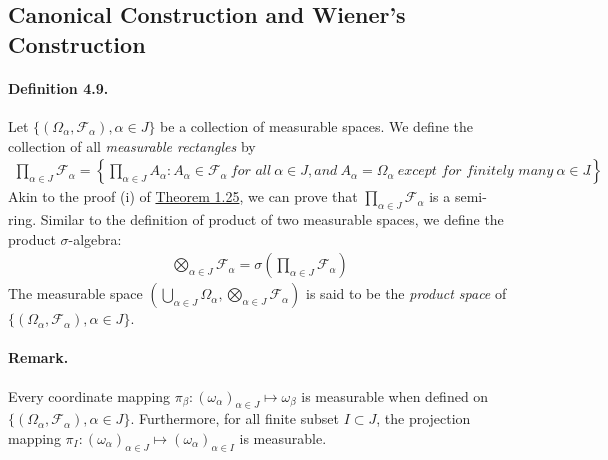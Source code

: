 \documentclass{article}
\numberwithin{equation}{section}
\theoremstyle{plain}
\theoremstyle{definition}
\begin{document}
\newpage
\subsection{Canonical Construction and Wiener's Construction}
\paragraph{Definition 4.9.\label{def:4.9}} Let $\{(\Omega_\alpha,\mathscr{F}_\alpha),\alpha\in J\}$ be a collection of measurable spaces. We define the collection of all \textit{measurable rectangles} by
\begin{align*}
	\prod_{\alpha\in J}\mathscr{F}_\alpha = \left\{\prod_{\alpha\in J}A_\alpha:A_\alpha\in\mathscr{F}_\alpha\ \textit{for all}\ \alpha\in J,\textit{and}\ A_\alpha=\Omega_\alpha\ \textit{except for finitely many}\ \alpha\in J\right\}.
\end{align*}
Akin to the proof (i) of \hyperref[thm:1.25]{Theorem 1.25}, we can prove that $\prod_{\alpha\in J}\mathscr{F}_\alpha$ is a semi-ring. Similar to the definition of product of two measurable spaces, we define the product $\sigma$-algebra:
\begin{align*}
	\bigotimes_{\alpha\in J}\mathscr{F}_\alpha = \sigma\left(\prod_{\alpha\in J}\mathscr{F}_\alpha\right)
\end{align*}
The measurable space $\left(\bigcup_{\alpha\in J}\Omega_\alpha,\bigotimes_{\alpha\in J}\mathscr{F}_\alpha\right)$ is said to be the \textit{product space} of $\{(\Omega_\alpha,\mathscr{F}_\alpha),\alpha\in J\}$.
\paragraph{Remark.} Every coordinate mapping $\pi_\beta:(\omega_\alpha)_{\alpha\in J}\mapsto\omega_\beta$ is measurable when defined on $\{(\Omega_\alpha,\mathscr{F}_\alpha),\alpha\in J\}$. Furthermore, for all finite subset $I\subset J$, the projection mapping $\pi_I:(\omega_\alpha)_{\alpha\in J}\mapsto(\omega_\alpha)_{\alpha\in I}$ is measurable.
\end{document}
